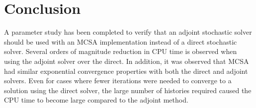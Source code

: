 \documentclass[note]{TechNote}
\begin{document}
\section{Conclusion}
A parameter study has been completed to verify that an adjoint
stochastic solver should be used with an MCSA implementation instead
of a direct stochastic solver. Several orders of magnitude reduction
in CPU time is observed when using the adjoint solver over the
direct. In addition, it was observed that MCSA had similar exponential
convergence properties with both the direct and adjoint solvers. Even
for cases where fewer iterations were needed to converge to a solution
using the direct solver, the large number of histories required caused
the CPU time to become large compared to the adjoint method.





\closing
\caution
\end{document}
